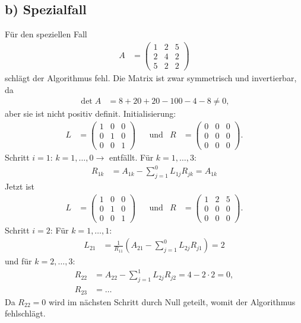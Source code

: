 \documentclass[english, parskip=full]{scrartcl}
\newcommand{\kla}{}
\newcommand{\tecxt}{}
\begin{document}
\subsection*{b) Spezialfall}
Für den speziellen Fall
\begin{align}
A &= \begin{pmatrix}
1 & 2 & 5 \\ 2 & 4 & 2 \\ 5 & 2 & 2
\end{pmatrix}
\end{align}
schlägt der Algorithmus fehl. 
Die Matrix ist zwar symmetrisch und invertierbar, da
\begin{align}
\det A &= 8 + 20 + 20 - 100 - 4 - 8 \neq 0,
\end{align}
aber sie ist nicht positiv definit.
Initialisierung:
\begin{align}
L &= \begin{pmatrix}
1 & 0 & 0 \\ 0 & 1 & 0 \\ 0 & 0 & 1
\end{pmatrix} && \tecxt\text{und} & R &= \begin{pmatrix}
0 & 0 & 0 \\ 0 & 0 & 0 \\ 0 & 0 & 0
\end{pmatrix}.
\end{align}
Schritt $i=1$: $k=1,\dots,0 \rightarrow$ entfällt. 
Für $k=1,\dots,3$:
\begin{align}
R_{1k} &= A_{1k} - \sum_{j=1}^0 L_{1j}R_{jk} = A_{1k}
\end{align}
Jetzt ist
\begin{align}
L &= \begin{pmatrix}
1 & 0 & 0 \\ 0 & 1 & 0 \\ 0 & 0 & 1
\end{pmatrix} && \tecxt\text{und} & R &= \begin{pmatrix}
1 & 2 & 5 \\ 0 & 0 & 0 \\ 0 & 0 & 0
\end{pmatrix}.
\end{align}
Schritt $i=2$: Für $k=1,\dots,1$:
\begin{align}
L_{21} &= \frac{1}{R_{11}} \kla\left( A_{21} - \sum_{j=1}^{0}L_{2j}R_{j1} \right) = 2
\end{align} 
und für $k=2,\dots,3$:
\begin{align}
R_{22} &= A_{22} - \sum_{j=1}^1 L_{2j}R_{j2} = 4 - 2\cdot 2 = 0,\\
R_{23} &= \dots
\end{align}
Da $R_{22} = 0$ wird im nächsten Schritt durch Null geteilt, womit der Algorithmus fehlschlägt.
\end{document}
